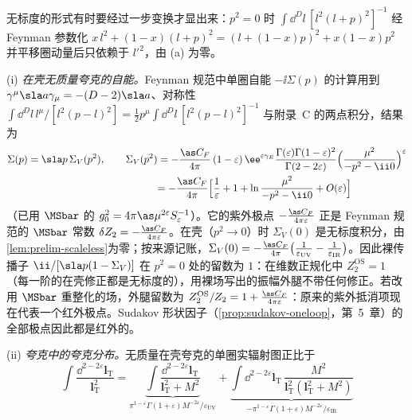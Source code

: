 无标度的形式有时要经过一步变换才显出来：$p^2=0$ 时 $\int\dd^Dl\,[l^2(l+p)^2]^{-1}$ 经 Feynman 参数化 $x\,l^2+(1-x)(l+p)^2=(l+(1-x)p)^2+x(1-x)p^2$ 并平移圈动量后只依赖于 $l'^2$，由 (a) 为零。

\begin{example}\label{ex:prelim-scaleless}
(i) \emph{在壳无质量夸克的自能。}Feynman 规范中单圈自能 $-\ii\Sigma(p)$ 的计算用到 $\gamma^\mu\sla a\gamma_\mu=-(D-2)\sla a$、对称性 $\int\dd^Dl\,l^\mu/[l^2(p-l)^2]=\frac12p^\mu\int\dd^Dl\,[l^2(p-l)^2]^{-1}$ 与附录~C 的两点积分，结果为
\begin{equation}\label{eq:prelim-sigma}
\begin{aligned}
\Sigma(p)&=\sla p\,\Sigma_V(p^2),\qquad \Sigma_V(p^2)=-\frac{\as C_F}{4\pi}\,(1-\varepsilon)\,\ee^{\varepsilon\gamma_E}\frac{\Gamma(\varepsilon)\Gamma(1-\varepsilon)^2}{\Gamma(2-2\varepsilon)}\Big(\frac{\mu^2}{-p^2-\ii0}\Big)^{\varepsilon}\\
&\phantom{=\sla p\,\Sigma_V(p^2),\qquad \Sigma_V(p^2)}=-\frac{\as C_F}{4\pi}\Big[\frac1\varepsilon+1+\ln\frac{\mu^2}{-p^2-\ii0}+O(\varepsilon)\Big]
\end{aligned}
\end{equation}
（已用 $\MSbar$ 的 $g_0^2=4\pi\as\mu^{2\varepsilon}S_\varepsilon^{-1}$）。它的紫外极点 $-\frac{\as C_F}{4\pi\varepsilon}$ 正是 Feynman 规范的 $\MSbar$ 常数 $\delta Z_2=-\frac{\as C_F}{4\pi\varepsilon}$。在壳（$p^2\to0$）时 $\Sigma_V(0)$ 是无标度积分，由\cref{lem:prelim-scaleless}为零；按来源记账，$\Sigma_V(0)=-\frac{\as C_F}{4\pi}\big(\frac1{\varepsilon_{\mathrm{UV}}}-\frac1{\varepsilon_{\mathrm{IR}}}\big)$。因此裸传播子 $\ii/[\sla p(1-\Sigma_V)]$ 在 $p^2=0$ 处的留数为 $1$：在维数正规化中 $Z_2^{\mathrm{OS}}=1$（每一阶的在壳修正都是无标度的），用裸场写出的振幅外腿不带任何修正。若改用 $\MSbar$ 重整化的场，外腿留数为 $Z_2^{\mathrm{OS}}/Z_2=1+\frac{\as C_F}{4\pi\varepsilon}$：原来的紫外抵消项现在代表一个红外极点。Sudakov 形状因子（\cref{prop:sudakov-oneloop}，第~5~章）的全部极点因此都是红外的。
\par
(ii) \emph{夸克中的夸克分布。}无质量在壳夸克的单圈实辐射图正比于
\begin{equation}\label{eq:prelim-lT-scaleless}
\int\frac{\dd^{2-2\varepsilon}\mathbf l_{\mathrm T}}{\mathbf l_{\mathrm T}^2}
=\underbrace{\int\frac{\dd^{2-2\varepsilon}\mathbf l_{\mathrm T}}{\mathbf l_{\mathrm T}^2+M^2}}_{\pi^{1-\varepsilon}\Gamma(1+\varepsilon)M^{-2\varepsilon}/\varepsilon_{\mathrm{UV}}}
+\underbrace{\int\dd^{2-2\varepsilon}\mathbf l_{\mathrm T}\,\frac{M^2}{\mathbf l_{\mathrm T}^2(\mathbf l_{\mathrm T}^2+M^2)}}_{-\pi^{1-\varepsilon}\Gamma(1+\varepsilon)M^{-2\varepsilon}/\varepsilon_{\mathrm{IR}}}

\end{equation}
\end{example}
